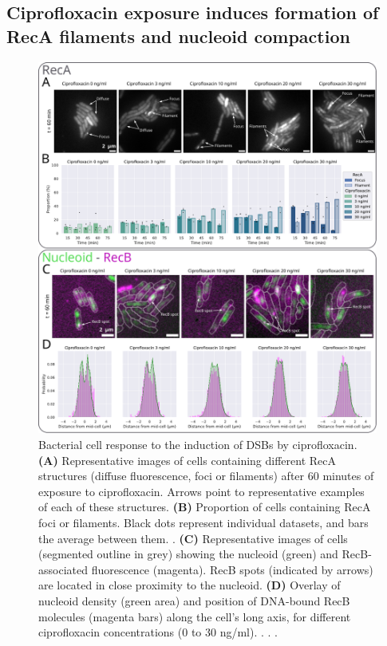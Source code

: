 \subsection*{Ciprofloxacin exposure induces formation of RecA filaments and nucleoid compaction}

\begin{figure}[htbp]
    \centering
    \includegraphics[width=.8\textwidth]{Figures/Fig3_cell_response.pdf}
    \caption{Bacterial cell response to the induction of DSBs by ciprofloxacin. \textbf{(A)} Representative images of cells containing different RecA structures (diffuse fluorescence, foci or filaments) after 60 minutes of exposure to ciprofloxacin. Arrows point to representative examples of each of these structures. \textbf{(B)} Proportion of cells containing RecA foci or filaments. Black dots represent individual datasets, and bars the average between them. . \textbf{(C)} Representative images of cells (segmented outline in grey) showing the nucleoid (green) and RecB-associated fluorescence (magenta). RecB spots (indicated by arrows) are located in close proximity to the nucleoid. \textbf{(D)} Overlay of nucleoid density (green area) and position of DNA-bound RecB molecules (magenta bars) along the cell's long axis, for different ciprofloxacin concentrations (0 to 30 ng/ml). . . .}
    \label{Fig:reca_nucleoid}
\end{figure}

